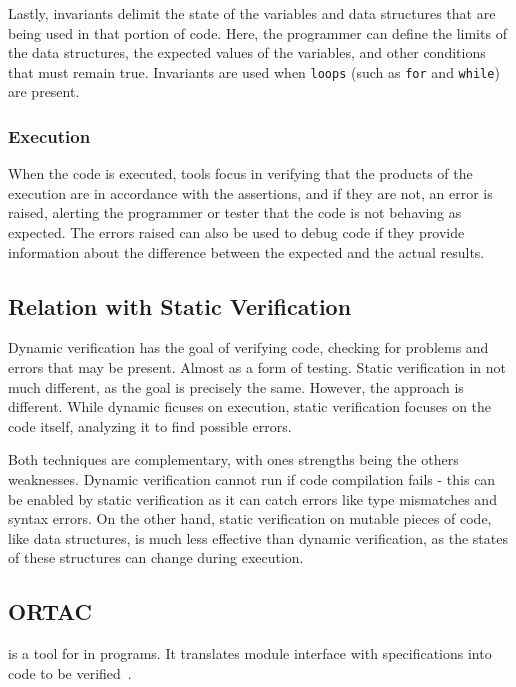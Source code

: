 Lastly, invariants delimit the state of the variables and data structures that are 
being used in that portion of code. Here, the programmer can define the limits of 
the data structures, the expected values of the variables, and other conditions that 
must remain true. Invariants are used when \texttt{loops} (such as \texttt{for} and 
\texttt{while}) are present.

\subsubsection{Execution}
\label{subsub:execution}

When the code is executed, tools focus in verifying that the products of 
the execution are in accordance with the assertions, and if they are not, an error is 
raised, alerting the programmer or tester that the code is not behaving as expected. 
The errors raised can also be used to debug code if they provide information about the 
difference between the expected and the actual results.

\subsection{Relation with Static Verification}
\label{sub:relation_with_static_verification}

Dynamic verification has the goal of verifying code, checking for problems and errors 
that may be present. Almost as a form of testing. Static verification in not much different, 
as the goal is precisely the same. However, the approach is different. While dynamic ficuses 
on execution, static verification focuses on the code itself, analyzing it to find possible 
errors. 

Both techniques are complementary, with ones strengths being the others weaknesses.
Dynamic verification cannot run if code compilation fails - this can be enabled by static 
verification as it can catch errors like type mismatches and syntax errors. On the other hand, 
static verification on mutable pieces of code, like data structures, is much less effective 
than dynamic verification, as the states of these structures can change during execution.

\subsection{ORTAC}
\label{sub:ortac}

\ortac is a tool for \rac in \ocaml programs. It translates \ocaml module interface with 
\gospellang specifications into code to be verified~\cite{Filliatre}.

